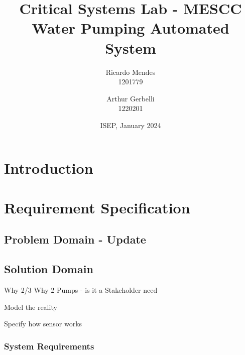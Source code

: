 \documentclass[11pt]{article}
\title{\textbf{Critical Systems Lab - MESCC\\ Water Pumping Automated System}}
\date{ISEP, January 2024}
\author{Ricardo Mendes\\ 1201779
\and Arthur Gerbelli\\ 1220201}
\begin{document}
\maketitle              
\newpage
\tableofcontents
\newpage

%
\section{Introduction}

\section{Requirement Specification}

\subsection{Problem Domain - Update}

\subsection{Solution Domain}

Why 2/3
Why 2 Pumps - is it a Stakeholder need

Model the reality

Specify how sensor works

\subsubsection{System Requirements}
\end{document}
